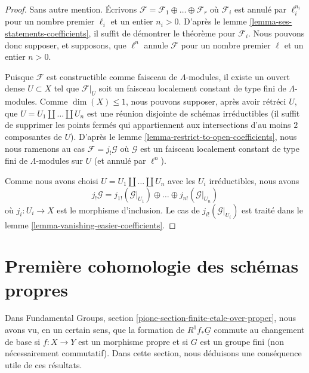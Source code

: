 \begin{proof}
Sans autre mention.
Écrivons $\mathcal{F} = \mathcal{F}_1 \oplus \ldots \oplus \mathcal{F}_r$
où $\mathcal{F}_i$ est annulé par $\ell_i^{n_i}$
pour un nombre premier $\ell_i$ et un entier $n_i > 0$.
D'après le lemme \ref{lemma-ses-statements-coefficients}, il suffit
de démontrer le théorème pour $\mathcal{F}_i$. Nous pouvons donc supposer,
et supposons, que $\ell^n$ annule $\mathcal{F}$ pour un nombre premier $\ell$
et un entier $n > 0$.

\medskip\noindent
Puisque $\mathcal{F}$ est constructible comme faisceau de $\Lambda$-modules,
il existe un ouvert dense $U \subset X$ tel que $\mathcal{F}|_U$ soit un
faisceau localement constant de type fini de $\Lambda$-modules.
Comme $\dim(X) \leq 1$, nous pouvons supposer, après avoir rétréci $U$, que
$U = U_1 \amalg \ldots \amalg U_n$ est une réunion disjointe de schémas
irréductibles (il suffit de supprimer les points fermés qui appartiennent aux
intersections d'au moins $2$ composantes de $U$). D'après le
lemme \ref{lemma-restrict-to-open-coefficients},
nous nous ramenons au cas
$\mathcal{F} = j_!\mathcal{G}$ où $\mathcal{G}$ est un faisceau localement
constant de type fini de $\Lambda$-modules sur $U$ (et annulé
par $\ell^n$).

\medskip\noindent
Comme nous avons choisi $U = U_1 \amalg \ldots \amalg U_n$ avec les $U_i$
irréductibles, nous avons
$$
j_!\mathcal{G} =
j_{1!}(\mathcal{G}|_{U_1}) \oplus \ldots \oplus
j_{n!}(\mathcal{G}|_{U_n})
$$
où $j_i : U_i \to X$ est le morphisme d'inclusion.
Le cas de $j_{i!}(\mathcal{G}|_{U_i})$ est traité dans le
lemme \ref{lemma-vanishing-easier-coefficients}.
\end{proof}








\section{Première cohomologie des schémas propres}
\label{section-finite-etale-over-proper}

\noindent
Dans Fundamental Groups, section \ref{pione-section-finite-etale-over-proper},
nous avons vu, en un certain sens, que la formation de
$R^1f_*\underline{G}$ commute au changement de base si $f : X \to Y$
est un morphisme propre et si $G$ est un groupe fini (non nécessairement
commutatif). Dans cette section,
nous déduisons une conséquence utile de ces résultats.

